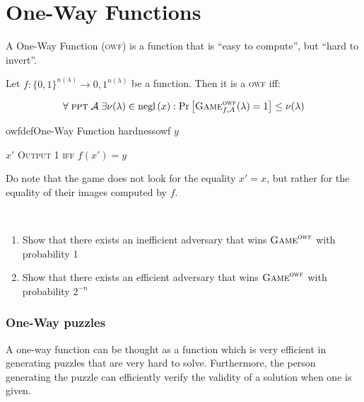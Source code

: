 \section{One-Way Functions}

A One-Way Function (\textsc{owf}) is a function that is ``easy to compute'', but ``hard to invert''.

\begin{definition}    
    Let $f : \{0,1\}^{n(\lambda)} \to {0,1}^{n(\lambda)}$ be a function. Then it is a \textsc{owf} iff:

    \begin{equation}
        \forall\; \textsc{ppt}\; \mathcal{A}\;
        \exists\nu(\lambda) \in \mathrm{negl}\left({x}\right) :
        \Pr \left[ \textsc{Game}_{f,A}^\textsc{owf} (\lambda) = 1 \right]
        \leq \nu(\lambda)
    \end{equation}

\end{definition}


\begin{cryptogame}{owfdef}{One-Way Function hardness}{owf}
    {$y$}
    {}

    \cseqdelay

    \send{}
    {$x'$}
    {\textsc{Output 1 iff} $f(x')=y$}

\end{cryptogame}

Do note that the game does not look for the equality $x' = x$, but rather for the equality of their images computed by $f$.

\pagebreak

\begin{exercise}
    \
    \begin{enumerate}
        \item Show that there exists an inefficient adversary that wins $\textsc{Game}^\textsc{owf}$ with probability 1
        \item Show that there exists an efficient adversary that wins $\textsc{Game}^\textsc{owf}$ with probability $2^{-n}$
    \end{enumerate}
\end{exercise}


\subsubsection{One-Way puzzles}
A one-way function can be thought as a function which is very efficient in generating puzzles that are very hard to solve. Furthermore, the person generating the puzzle can efficiently verify the validity of a solution when one is given.

